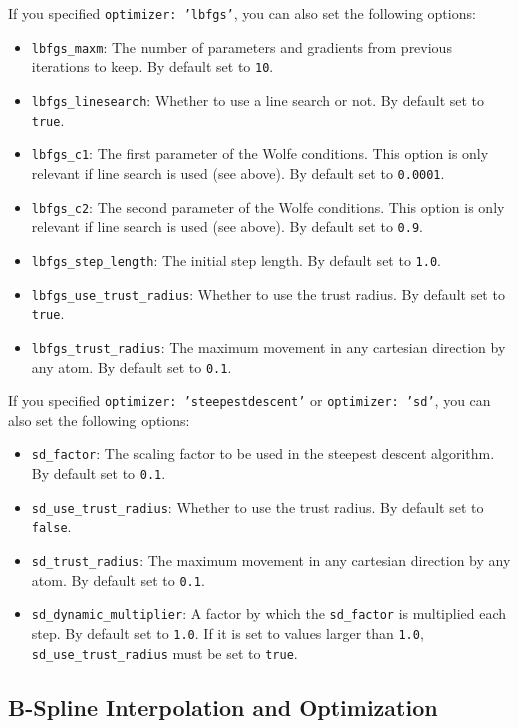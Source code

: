 \documentclass[]{tufte-book}
\begin{document}
If you specified \texttt{optimizer: 'lbfgs'}, you can also set the following options:
\begin{itemize}
\item \texttt{lbfgs\_maxm}: The number of parameters and gradients from previous iterations to keep. By default set to
\texttt{10}.
\item \texttt{lbfgs\_linesearch}: Whether to use a line search or not. By default set to \texttt{true}.
\item \texttt{lbfgs\_c1}: The first parameter of the Wolfe conditions. This option is only relevant if line search is
used (see above). By default set to \texttt{0.0001}.
\item \texttt{lbfgs\_c2}:  The second parameter of the Wolfe conditions. This option is only relevant if line search is
used (see above). By default set to \texttt{0.9}.
\item \texttt{lbfgs\_step\_length}: The initial step length. By default set to \texttt{1.0}.
\item \texttt{lbfgs\_use\_trust\_radius}: Whether to use the trust radius. By default set to \texttt{true}.
\item \texttt{lbfgs\_trust\_radius}: The maximum movement in any cartesian direction by any atom. By default set to \texttt{0.1}.
\end{itemize}

If you specified \texttt{optimizer: 'steepestdescent'} or \texttt{optimizer: 'sd'}, you can also set the following options:
\begin{itemize}
\item \texttt{sd\_factor}: The scaling factor to be used in the steepest descent algorithm. By default set to \texttt{0.1}.
\item \texttt{sd\_use\_trust\_radius}: Whether to use the trust radius. By default set to \texttt{false}.
\item \texttt{sd\_trust\_radius}: The maximum movement in any cartesian direction by any atom. By default set to \texttt{0.1}.
\item \texttt{sd\_dynamic\_multiplier}: A factor by which the \texttt{sd\_factor} is multiplied each step. By default set to \texttt{1.0}.
If it is set to values larger than \texttt{1.0}, \texttt{sd\_use\_trust\_radius} must be set to \texttt{true}.
\end{itemize}

\subsection{B-Spline Interpolation and Optimization}\label{sec: b-spline}
\end{document}
